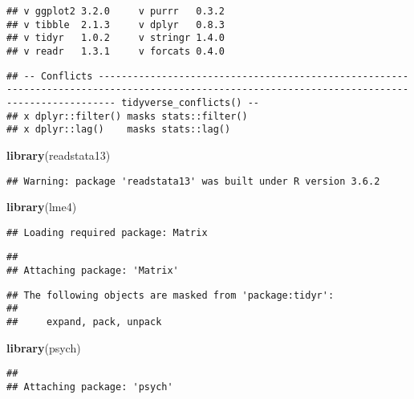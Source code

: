 \documentclass[]{article}
\newenvironment{Shaded}{\begin{snugshade}}{\end{snugshade}}
\newcommand{\KeywordTok}[1]{\textcolor[rgb]{0.13,0.29,0.53}{\textbf{#1}}}
\newcommand{\NormalTok}[1]{#1}
\begin{document}
\begin{verbatim}
## v ggplot2 3.2.0     v purrr   0.3.2
## v tibble  2.1.3     v dplyr   0.8.3
## v tidyr   1.0.2     v stringr 1.4.0
## v readr   1.3.1     v forcats 0.4.0
\end{verbatim}

\begin{verbatim}
## -- Conflicts ----------------------------------------------------------------------------------------------------------------------------------------------- tidyverse_conflicts() --
## x dplyr::filter() masks stats::filter()
## x dplyr::lag()    masks stats::lag()
\end{verbatim}

\begin{Shaded}
\begin{Highlighting}[]
\KeywordTok{library}\NormalTok{(readstata13)}
\end{Highlighting}
\end{Shaded}

\begin{verbatim}
## Warning: package 'readstata13' was built under R version 3.6.2
\end{verbatim}

\begin{Shaded}
\begin{Highlighting}[]
\KeywordTok{library}\NormalTok{(lme4)}
\end{Highlighting}
\end{Shaded}

\begin{verbatim}
## Loading required package: Matrix
\end{verbatim}

\begin{verbatim}
## 
## Attaching package: 'Matrix'
\end{verbatim}

\begin{verbatim}
## The following objects are masked from 'package:tidyr':
## 
##     expand, pack, unpack
\end{verbatim}

\begin{Shaded}
\begin{Highlighting}[]
\KeywordTok{library}\NormalTok{(psych)}
\end{Highlighting}
\end{Shaded}

\begin{verbatim}
## 
## Attaching package: 'psych'
\end{verbatim}
\end{document}
